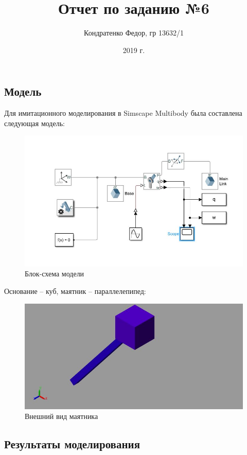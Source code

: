 \documentclass{article}
\date{2019 г.}
\author{Кондратенко Федор, гр 13632/1}
\title{Отчет по заданию №6}
\begin{document}
	\maketitle
	\subsection*{Модель}
	Для имитационного моделирования в Simscape Multibody была составлена следующая модель:
	\begin{figure}[H]
		\centering
		\includegraphics[width=0.7\linewidth]{model}
		\caption{Блок-схема модели}
		\label{fig:model}
	\end{figure}
	Основание -- куб, маятник -- параллелепипед:
	\begin{figure}[H]
		\centering
		\includegraphics[width=0.7\linewidth]{pend1}
		\caption{Внешний вид маятника}
		\label{fig:pend1}
	\end{figure}
	\subsection*{Результаты моделирования}
\end{document}
